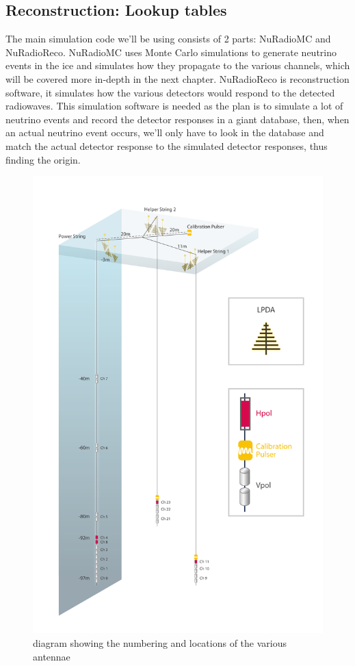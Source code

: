 \documentclass[11pt,a4paper,faculty=we,language=en,doctype=report]{cls/ugent-doc}
\begin{document}
\subsection{Reconstruction: Lookup tables}
The main simulation code we'll be using consists of 2 parts:
NuRadioMC\cite{Glaser_2020} and NuRadioReco\cite{Glaser_2019}. NuRadioMC uses
Monte Carlo simulations to generate neutrino events in the ice and simulates
how they propagate to the various channels, which will be covered more in-depth
in the next chapter. NuRadioReco is reconstruction software, it simulates how
the various detectors would respond to the detected radiowaves. This simulation
software is needed as the plan is to simulate a lot of neutrino events and
record the detector responses in a giant database, then, when an actual neutrino
event occurs, we'll only have to look in the database and match the actual
detector response to the simulated detector responses, thus finding the origin.
\begin{figure}
	\centering
	\includegraphics[height=0.9\textheight]{figures/detector.pdf}	
	\caption{diagram showing the numbering and locations of the various antennae}
	\label{fig:detector}
\end{figure}
\end{document}
